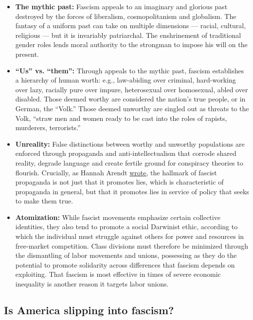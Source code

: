 \begin{itemize}
\item
  \textbf{The mythic past:} Fascism appeals to an imaginary and glorious
  past destroyed by the forces of liberalism, cosmopolitanism and
  globalism. The fantasy of a uniform past can take on multiple
  dimensions --- racial, cultural, religious --- but it is invariably
  patriarchal. The enshrinement of traditional gender roles lends moral
  authority to the strongman to impose his will on the present.
\item
  \textbf{``Us'' vs. ``them'':} Through appeals to the mythic past,
  fascism establishes a hierarchy of human worth: e.g., law-abiding over
  criminal, hard-working over lazy, racially pure over impure,
  heterosexual over homosexual, abled over disabled. Those deemed worthy
  are considered the nation's true people, or in German, the ``Volk.''
  Those deemed unworthy are singled out as threats to the Volk, ``straw
  men and women ready to be cast into the roles of rapists, murderers,
  terrorists.''
\item
  \textbf{Unreality:} False distinctions between worthy and unworthy
  populations are enforced through propaganda and anti-intellectualism
  that corrode shared reality, degrade language and create fertile
  ground for conspiracy theories to flourish. Crucially, as Hannah
  Arendt
  \href{https://books.google.com/books?id=5872U7QQl8oC\&printsec=frontcover\&source=gbs_ge_summary_r\&cad=0\#v=snippet\&q=It\%20was\%20always\%20a\%20too\%20little\%20noted\%20hallmark\%20of\%20fascist\%20propaganda\&f=false}{wrote},
  the hallmark of fascist propaganda is not just that it promotes lies,
  which is characteristic of propaganda in general, but that it promotes
  lies in service of policy that seeks to make them true.
\item
  \textbf{Atomization:} While fascist movements emphasize certain
  collective identities, they also tend to promote a social Darwinist
  ethic, according to which the individual must struggle against others
  for power and resources in free-market competition. Class divisions
  must therefore be minimized through the dismantling of labor movements
  and unions, possessing as they do the potential to promote solidarity
  across differences that fascism depends on exploiting. That fascism is
  most effective in times of severe economic inequality is another
  reason it targets labor unions.
\end{itemize}

\hypertarget{is-america-slipping-into-fascism}{%
\subsection{Is America slipping into
fascism?}\label{is-america-slipping-into-fascism}}

